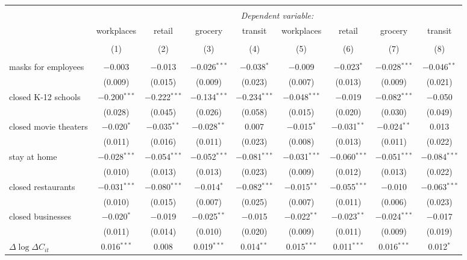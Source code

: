 \begin{tabular}{@{\extracolsep{1pt}}lcccccccc} 
\\[-1.8ex]\hline 
\hline \\[-1.8ex] 
 & \multicolumn{8}{c}{\textit{Dependent variable:}} \\ 
\cline{2-9} 
 & workplaces & retail & grocery & transit & workplaces & retail & grocery & transit \\ 
\\[-1.8ex] & (1) & (2) & (3) & (4) & (5) & (6) & (7) & (8)\\ 
\hline \\[-1.8ex] 
 masks for employees & $-$0.003 & $-$0.013 & $-$0.026$^{***}$ & $-$0.038$^{*}$ & $-$0.009 & $-$0.023$^{*}$ & $-$0.028$^{***}$ & $-$0.046$^{**}$ \\ 
  & (0.009) & (0.015) & (0.009) & (0.023) & (0.007) & (0.013) & (0.009) & (0.021) \\ 
  closed K-12 schools & $-$0.200$^{***}$ & $-$0.222$^{***}$ & $-$0.134$^{***}$ & $-$0.234$^{***}$ & $-$0.048$^{***}$ & $-$0.019 & $-$0.082$^{***}$ & $-$0.050 \\ 
  & (0.028) & (0.045) & (0.026) & (0.058) & (0.015) & (0.020) & (0.030) & (0.049) \\ 
  closed movie theaters & $-$0.020$^{*}$ & $-$0.035$^{**}$ & $-$0.028$^{**}$ & 0.007 & $-$0.015$^{*}$ & $-$0.031$^{**}$ & $-$0.024$^{**}$ & 0.013 \\ 
  & (0.011) & (0.016) & (0.011) & (0.023) & (0.008) & (0.013) & (0.011) & (0.022) \\ 
  stay at home & $-$0.028$^{***}$ & $-$0.054$^{***}$ & $-$0.052$^{***}$ & $-$0.081$^{***}$ & $-$0.031$^{***}$ & $-$0.060$^{***}$ & $-$0.051$^{***}$ & $-$0.084$^{***}$ \\ 
  & (0.010) & (0.013) & (0.013) & (0.023) & (0.009) & (0.012) & (0.013) & (0.022) \\ 
  closed restaurants & $-$0.031$^{***}$ & $-$0.080$^{***}$ & $-$0.014$^{*}$ & $-$0.082$^{***}$ & $-$0.015$^{**}$ & $-$0.055$^{***}$ & $-$0.010 & $-$0.063$^{***}$ \\ 
  & (0.010) & (0.015) & (0.007) & (0.025) & (0.007) & (0.011) & (0.006) & (0.023) \\ 
  closed businesses & $-$0.020$^{*}$ & $-$0.019 & $-$0.025$^{**}$ & $-$0.015 & $-$0.022$^{**}$ & $-$0.023$^{**}$ & $-$0.024$^{***}$ & $-$0.017 \\ 
  & (0.011) & (0.014) & (0.010) & (0.020) & (0.009) & (0.011) & (0.009) & (0.019) \\ 
  $\Delta \log \Delta C_{it}$ & 0.016$^{***}$ & 0.008 & 0.019$^{***}$ & 0.014$^{**}$ & 0.015$^{***}$ & 0.011$^{***}$ & 0.016$^{***}$ & 0.012$^{*}$ \\ 

\end{tabular}
